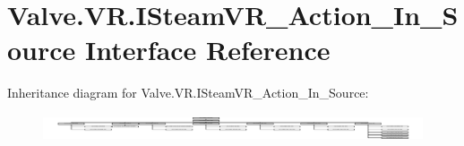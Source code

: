 \hypertarget{interface_valve_1_1_v_r_1_1_i_steam_v_r___action___in___source}{}\section{Valve.\+V\+R.\+I\+Steam\+V\+R\+\_\+\+Action\+\_\+\+In\+\_\+\+Source Interface Reference}
\label{interface_valve_1_1_v_r_1_1_i_steam_v_r___action___in___source}
Inheritance diagram for Valve.\+V\+R.\+I\+Steam\+V\+R\+\_\+\+Action\+\_\+\+In\+\_\+\+Source\+:\begin{figure}[H]
\begin{center}
\leavevmode
\includegraphics[height=0.808956cm]{interface_valve_1_1_v_r_1_1_i_steam_v_r___action___in___source}
\end{center}
\end{figure}
